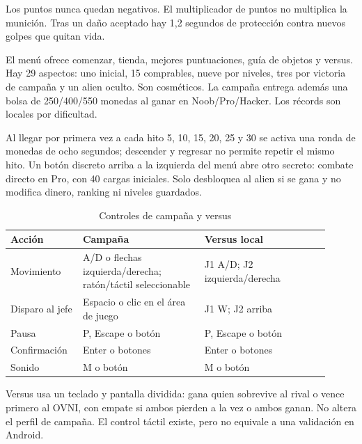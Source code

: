 Los puntos nunca quedan negativos. El multiplicador de puntos no multiplica la munición. Tras un daño aceptado hay 1,2 segundos de protección contra nuevos golpes que quitan vida.

El menú ofrece comenzar, tienda, mejores puntuaciones, guía de objetos y versus. Hay 29 aspectos: uno inicial, 15 comprables, nueve por niveles, tres por victoria de campaña y un alien oculto. Son cosméticos. La campaña entrega además una bolsa de 250/400/550 monedas al ganar en Noob/Pro/Hacker. Los récords son locales por dificultad.

Al llegar por primera vez a cada hito 5, 10, 15, 20, 25 y 30 se activa una ronda de monedas de ocho segundos; descender y regresar no permite repetir el mismo hito. Un botón discreto arriba a la izquierda del menú abre otro secreto: combate directo en Pro, con 40 cargas iniciales. Solo desbloquea al alien si se gana y no modifica dinero, ranking ni niveles guardados.

{\small
\begin{longtable}{p{0.2\linewidth}p{0.35\linewidth}p{0.36\linewidth}}
\caption{Controles de campaña y versus}\\
\toprule
Acción & Campaña & Versus local \\
\midrule
\endhead
Movimiento & A/D o flechas izquierda/derecha; ratón/táctil seleccionable & J1 A/D; J2 izquierda/derecha \\
Disparo al jefe & Espacio o clic en el área de juego & J1 W; J2 arriba \\
Pausa & P, Escape o botón & P, Escape o botón \\
Confirmación & Enter o botones & Enter o botones \\
Sonido & M o botón & M o botón \\
\bottomrule
\end{longtable}
}

Versus usa un teclado y pantalla dividida: gana quien sobrevive al rival o vence primero al OVNI, con empate si ambos pierden a la vez o ambos ganan. No altera el perfil de campaña. El control táctil existe, pero no equivale a una validación en Android.

